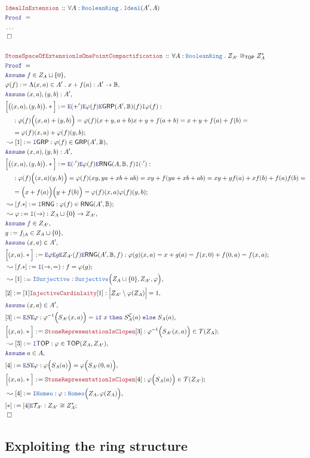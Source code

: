\documentclass[12pt]{scrartcl}
\newcommand{\TYPE}[1]{\textcolor{NavyBlue}{\mathtt{#1}}}
\newcommand{\LOGIC}[1]{\textcolor{Blue}{\mathtt{#1}}}
\newcommand{\THM}[1]{\textcolor{Maroon}{\mathtt{#1}}}
\renewcommand{\.}{\; . \;}
\newcommand{\de}{: \kern 0.1pc =}
\newcommand{\If}{\LOGIC{if} \;}
\newcommand{\Then}{ \; \LOGIC{then} \;}
\newcommand{\Else}{\; \LOGIC{else} \;}
\newcommand{\Theorem}[2]{& \THM{#1} \, :: \, #2 \\ & \Proof = \\ }
\newcommand{\NewLine}{\\ & \kern 1pc}
\newcommand{\Page}[1]{ \begin{align*} #1 \end{align*}   }
\newcommand{\NoProof}{ & \ldots \\ \EndProof}
\newcommand{\Intro}{\LOGIC{I}}
\newcommand{\Elim}{\LOGIC{E}}
\newcommand{\Say}[3]{& #1 \de #2 : #3, \\}
\newcommand{\SayIn}[3]{& #1 \de #2 \in #3, \\}
\newcommand{\Conclude}[3]{& #1 \de #2 : #3; \\}
\newcommand{\Derive}[3]{& \leadsto #1 \de #2 : #3, \\}
\newcommand{\DeriveConclude}[3]{& \leadsto #1 \de #2 : #3 ; \\}
\newcommand{\Assume}[2]{& \LOGIC{Assume} \; #1 : #2, \\}
\newcommand{\AssumeIn}[2]{& \LOGIC{Assume} \; #1 \in #2, \\}
\newcommand{\QED}{\; \square}
\newcommand{\EndProof}{& \QED \\}
\newcommand{\Proof}{\LOGIC{Proof} \; }
\newcommand{\Ideal}{\TYPE{Ideal}}
\newcommand{\C}{\mathcal{C}}
\newcommand{\GRP}{\mathsf{GRP}}
\newcommand{\RNG}{\mathsf{RNG}}
\newcommand{\TOP}{\mathsf{TOP}}
\newcommand{\T}{\mathcal{T}}
\newcommand{\Bool}{\mathbb{B}}
\newcommand{\BR}{\TYPE{BooleanRing}}
\begin{document}
\Page{
	\Theorem{IdealInExtension}{\forall A : \BR \. \Ideal(A',A)}
	\NoProof
	\\
	\Theorem{StoneSpaceOfExtensionIsOnePointCompactification}
	{
		\forall A : \BR \. 
		Z_{A'} \cong_\TOP Z_A^*
	}
	\AssumeIn{f}{Z_{A} \sqcup \{0\}}
	\Say{\varphi(f)}{\Lambda (x,a) \in A' \. x + f(a)}{ A' \to \Bool}
	\Assume{(x,a),(y,b)}{A'}
	\Conclude{\Big[\big((x,a),(y,b)\big).*\Big]}
	{
		\Elim (+')
		\Elim \varphi(f) 
		\Elim \GRP(A',\Bool)(f)
		\Intro \varphi(f)
	}
	{
		\NewLine : 
		\varphi(f)\Big( (x,a) + (y,b) \Big) = 
		\varphi(f)( x + y,a + b  )
		x + y + f(a + b) = 
		x + y + f(a) + f(b) = \NewLine = 
		\varphi(f)(x,a) + \varphi(f)(y,b)
	}
	\Derive{[1]}{\Intro \GRP}{\varphi(f) \in \GRP(A',\Bool)}
	\Assume{(x,a),(y,b)}{A'}
	\Conclude{\Big[\big((x,a),(y,b)\big).*\Big]}
	{
		\Elim (\cdot')
		\Elim \varphi(f) 
		\Elim \RNG(A,\Bool,f)
		\Intro (\cdot')
	}
	{
		\NewLine :
		\varphi(f)\Big( (x,a)(y,b) \Big) =
		\varphi(f)( xy,ya + xb + ab )  =
		xy +   f(ya + xb + ab) = 
		xy + yf(a) + xf(b) + f(a)f(b) = \NewLine = 
		\Big(x + f(a)\Big)\Big(y + f(b)\Big) =
		\varphi(f)(x,a)\varphi(f)(y,b)
	}
	\DeriveConclude{[f.*]}{\Intro \RNG}{\varphi(f) \in  \RNG(A',\Bool)}
	\Derive{\varphi}{\Intro(\to)}{Z_A \sqcup \{0\} \to Z_{A'}}
	\AssumeIn{f}{Z_{A'}}
	\SayIn{g}{f_{|A}}{Z_A \sqcup \{0\}}
	\AssumeIn{(x,a)}{A'}
	\Conclude{\Big[(x,a).*\Big]}
	{
		\Elim \varphi
		\Elim g
		\Elim Z_{A'}(f)
		\Elim \RNG(A',\Bool,f)
	}
	{
		\varphi(g)(x,a) =
		x + g(a)  =
		f(x,0) + f(0,a) = 
		f(x,a)
	}
	\DeriveConclude{[f.*]}
	{
		\Intro(\to,=)
	}
	{
		f = \varphi(g)
	}
	\Derive{[1]}{\Intro \TYPE{Surjective}}
	{
		\TYPE{Surjective}\Big( Z_A \sqcup \{0\}, Z_{A'} ,\varphi\Big)
	}
	\Say{[2]}{[1]\THM{InjectiveCardinlaity}[1]}{ \Big| Z_{A'}\setminus \varphi(Z_A) \Big| = 1}
	\AssumeIn{(x,a)}{A'}
	\Say{[3]}{\Elim S \Elim \varphi }
	{
		\varphi^{-1}\Big(S_{A'}(x,a)\Big) = 
		\If x \Then S_A^\C(a) \Else S_A(a)
	}
	\Conclude{\Big[(x,a).*\Big]}{ \THM{StoneRepresentationIsClopen}[3]   }
	{
		\varphi^{-1}\Big( S_{A'}(x,a)\Big) \in \T(Z_A)
	}
	\Derive{[3]}{\Intro \TOP}{ \varphi \in \TOP(Z_A,Z_{A'})}
	\AssumeIn{a}{A}
	\Say{[4]}{\Elim S \Elim \varphi }
	{
		\varphi\Big(S_{A}(a)\Big) = 
		\varphi\Big(S_{A'}(0,a)\Big)
	}
	\Conclude{\Big[(x,a).*\Big]}{ \THM{StoneRepresentationIsClopen}[4]   }
	{
		\varphi\Big( S_{A}(a)\Big) \in \T(Z_{A'})
	}
	\Derive{[4]}{\Intro \TYPE{Homeo}}{ \varphi : \TYPE{Homeo}\Big(Z_A,\varphi(Z_{A})\Big)}
	\Conclude{[*]}{[4]\Elim \T_{A'}}{Z_{A'} \cong Z_A^*}
	\EndProof
}
\newpage
\subsection{Exploiting the ring structure}
\end{document}
